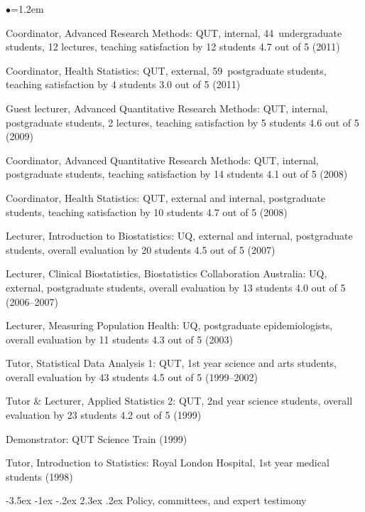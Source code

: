 \documentclass[a4paper,11pt]{article}
\makeatletter
\renewcommand\section{\@startsection {section}{1}{\z@}%
                                   {-3.5ex \@plus -1ex \@minus -.2ex}%
                                   {2.3ex \@plus.2ex}%
                                   {\normalfont\large\bfseries\color{blue}}}
\renewcommand{\labelitemi}{$\bullet$}
\makeatother
\begin{document}
\begin{raggedright}
\begin{list}{\labelitemi}{\leftmargin=1.2em}\addtolength{\itemsep}{-0.5\baselineskip}
\item Coordinator, Advanced Research Methods: QUT, internal, 44~undergraduate
students, 12 lectures, teaching satisfaction by 12 students 4.7 out of 5 (2011)
\item Coordinator, Health Statistics: QUT, external, 59~postgraduate
students, teaching satisfaction by 4 students 3.0 out of 5 (2011)
\item Guest lecturer, Advanced Quantitative Research Methods: QUT, internal, postgraduate
students, 2 lectures, teaching satisfaction by 5 students 4.6 out of 5 (2009)
\item Coordinator, Advanced Quantitative Research Methods: QUT, internal, postgraduate
students, teaching satisfaction by 14 students 4.1 out of 5 (2008)
\item Coordinator, Health Statistics: QUT, external and internal, postgraduate students, teaching
satisfaction by 10 students 4.7 out of 5 (2008)
\item Lecturer, Introduction to Biostatistics: UQ, external and internal, postgraduate students,
overall evaluation by 20 students 4.5 out of 5 (2007)
\item Lecturer, Clinical Biostatistics, Biostatistics Collaboration Australia: UQ, external,
postgraduate students, overall evaluation by 13 students 4.0 out of 5 (2006--2007)
\item Lecturer, Measuring Population Health: UQ, postgraduate epidemiologists, overall evaluation
by 11 students 4.3 out of 5 (2003)
\item Tutor, Statistical Data Analysis 1: QUT, 1st year science and arts students, overall evaluation
by 43 students 4.5 out of 5 (1999--2002)
\item Tutor \& Lecturer, Applied Statistics 2: QUT, 2nd year science students, overall evaluation by
23 students 4.2 out of 5 (1999)
\item Demonstrator: QUT Science Train (1999)
\item Tutor, Introduction to Statistics: Royal London Hospital, 1st year medical students (1998)
\end{list}


\section{Policy, committees, and expert testimony}


\end{raggedright}
\end{document}
